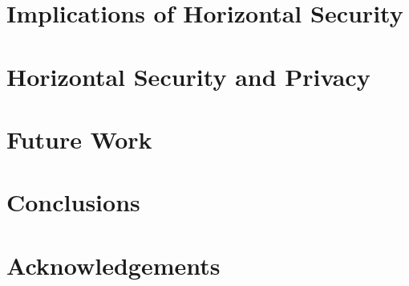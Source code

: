 \documentclass[sigconf, authordraft, anonymous]{acmart}
\theoremstyle{mydef}
\begin{document}
\section{Implications of Horizontal Security}
\label{sec:implications}


\section{Horizontal Security and Privacy}
\label{sec:privacy}


\section{Future Work}
\label{sec:futurework}


\section{Conclusions}
\label{sec:conclusion}


\section{Acknowledgements}




\end{document}
